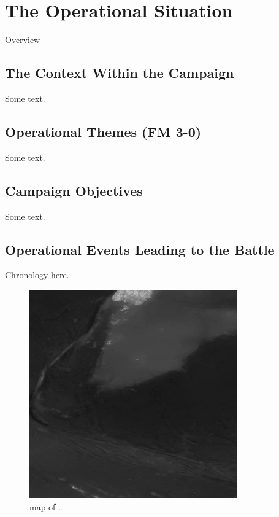 \section{The Operational Situation}

Overview

\subsection{The Context Within the Campaign}

Some text.

\subsection{Operational Themes (FM 3-0)}

Some text.

\subsection{Campaign Objectives}

Some text.

\subsection{Operational Events Leading to the Battle}

Chronology here.

\begin{figure}[h!]
\centering
\includegraphics[width=0.8\textwidth]{gfx/map1}
\caption{map of \ldots}
\end{figure}



